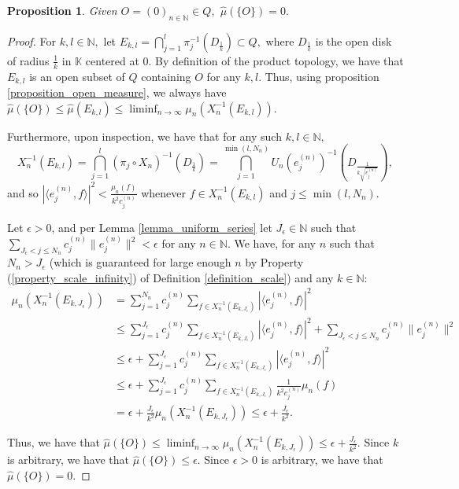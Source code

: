 \documentclass{amsart}
\newtheorem{prop}[thm]{Proposition}
\theoremstyle{definition}
\theoremstyle{remark}
\def \HMU{\hat{\mu}}
\def \LL{\langle}
\def \RR{\rangle}
\begin{document}
\begin{prop}\label{proposition_null_origin}
	Given $O=(0)_{n\in\mathbb{N}}\in Q,$ $\HMU(\{O\})=0.$
\end{prop}
\begin{proof}
		For $k,l\in\mathbb{N},$ let $E_{k,l}=\bigcap_{j=1}^l \pi_j^{-1}(D_{\frac{1}{k}})\subset Q,$ where $D_{\frac{1}{k}}$ is the open disk of radius $\frac{1}{k}$ in $\mathbb{K}$ centered at $0$. By definition of the product topology, we have that $E_{k,l}$ is an open subset of $Q$ containing $O$ for any $k,l$.  Thus, using proposition \ref{proposition_open_measure}, we always have $\HMU(\{O\})\leq \HMU(E_{k,l})\leq \liminf_{n\rightarrow\infty} \mu_n(X_n^{-1}(E_{k,l})).$
		
		Furthermore, upon inspection, we have that for any such $k,l\in \mathbb{N},$  $$X_n^{-1}(E_{k,l})=\bigcap_{j=1}^l (\pi_j\circ X_n)^{-1}(D_{\frac{1}{k}})=\bigcap_{j=1}^{\min(l,N_n)} U_n(e_j^{(n)})^{-1}(D_{\frac{1}{k\sqrt{c_j^{(n)}}}}),$$ and so $|\LL e_j^{(n)}, f\RR|^2 < \frac{\mu_n(f)}{k^2 c_j^{(n)}}$ whenever $f\in X_n^{-1}(E_{k,l})$ and $j\leq \min(l,N_n).$ 
		
		Let $\epsilon>0$, and per Lemma \ref{lemma_uniform_series} let $J_{\epsilon}\in\mathbb{N}$ such that $\sum_{J_{\epsilon}<j\leq N_n}c_j^{(n)}\|e_j^{(n)}\|^2<\epsilon$ for any $n\in \mathbb{N}.$ We have, for any $n$ such that $N_n>J_{\epsilon}$ (which is guaranteed for large enough $n$ by Property (\ref{property_scale_infinity}) of Definition \ref{definition_scale}) and any $k\in\mathbb{N}$:
		\begin{align*}
				\mu_n(X_n^{-1}(E_{k,J_{\epsilon}}))&=\sum_{j=1}^{N_n}c_j^{(n)}\sum_{f\in X_n^{-1}(E_{k,J_{\epsilon}})} |\LL e_j^{(n)}, f\RR|^2\\
				&\leq \sum_{j=1}^{J_{\epsilon}}c_j^{(n)}\sum_{f\in X_n^{-1}(E_{k,J_{\epsilon}})} |\LL e_j^{(n)}, f\RR|^2+\sum_{J_{\epsilon}<j\leq N_n}c_j^{(n)}\|e_j^{(n)}\|^2\\
				&\leq \epsilon+\sum_{j=1}^{J_{\epsilon}}c_j^{(n)}\sum_{f\in X_n^{-1}(E_{k,J_{\epsilon}})} |\LL e_j^{(n)}, f\RR|^2\\
				&\leq\epsilon+\sum_{j=1}^{J_{\epsilon}}c_j^{(n)}\sum_{f\in X_n^{-1}(E_{k,J_{\epsilon}})}\frac{1}{k^2c_j^{(n)}}\mu_n(f)\\
				&=\epsilon+\frac{J_{\epsilon}}{k^2}\mu_n(X_n^{-1}(E_{k,J_{\epsilon}}))\leq \epsilon+\frac{J_{\epsilon}}{k^2}. 
			\end{align*}  
		
		Thus, we have that $\HMU(\{O\})\leq\liminf_{n\rightarrow\infty} \mu_n(X_n^{-1}(E_{k,J_{\epsilon}}))\leq \epsilon+\frac{J_{\epsilon}}{k^2}.$ Since $k$ is arbitrary, we have that $\HMU(\{O\})\leq\epsilon.$ Since $\epsilon>0$ is arbitrary, we have that $\HMU(\{O\})=0.$
\end{proof}
\end{document}
